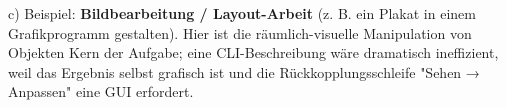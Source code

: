 \documentclass[11pt, a4paper]{article}
\begin{document}
c) Beispiel: \textbf{Bildbearbeitung / Layout-Arbeit} (z. B. ein Plakat in einem Grafikprogramm gestalten). Hier ist die räumlich-visuelle Manipulation von Objekten Kern der Aufgabe; eine CLI-Beschreibung wäre dramatisch ineffizient, weil das Ergebnis selbst grafisch ist und die Rückkopplungsschleife "Sehen → Anpassen" eine GUI erfordert.





\end{document}
